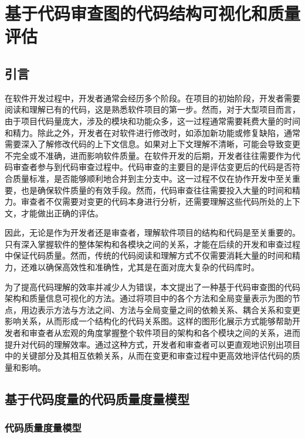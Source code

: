 \chapter{基于代码审查图的代码结构可视化和质量评估}
\section{引言}


在软件开发过程中，开发者通常会经历多个阶段。在项目的初始阶段，开发者需要阅读和理解已有的代码，这是熟悉软件项目的第一步。然而，对于大型项目而言，由于项目代码量庞大，涉及的模块和功能众多，这一过程通常需要耗费大量的时间和精力。除此之外，开发者在对软件进行修改时，如添加新功能或修复缺陷，通常需要深入了解修改代码的上下文信息。如果对上下文理解不清晰，可能会导致变更不完全或不准确，进而影响软件质量。在软件开发的后期，开发者往往需要作为代码审查者参与到代码审查过程中。代码审查的主要目的是评估变更后的代码是否符合质量标准，是否能够顺利地合并到主分支中。这一过程不仅在协作开发中至关重要，也是确保软件质量的有效手段。然而，代码审查往往需要投入大量的时间和精力\cite{花子涵2024代码审查自动化研究综述}。审查者不仅需要对变更的代码本身进行分析，还需要理解这些代码所处的上下文，才能做出正确的评估。

因此，无论是作为开发者还是审查者，理解软件项目的结构和代码是至关重要的。只有深入掌握软件的整体架构和各模块之间的关系，才能在后续的开发和审查过程中保证代码质量。然而，传统的代码阅读和理解方式不仅需要消耗大量的时间和精力，还难以确保高效性和准确性，尤其是在面对庞大复杂的代码库时。

为了提高代码理解的效率并减少人为错误，本文提出了一种基于代码审查图的代码架构和质量信息可视化的方法。通过将项目中的各个方法和全局变量表示为图的节点，用边表示方法与方法之间、方法与全局变量之间的依赖关系、耦合关系和变更影响关系，从而形成一个结构化的代码关系图。这样的图形化展示方式能够帮助开发者和审查者从宏观的角度掌握整个软件项目的架构和各个模块之间的关系，进而提升对代码的理解效率。通过这种方式，开发者和审查者可以更直观地识别出项目中的关键部分及其相互依赖关系，从而在变更和审查过程中更高效地评估代码的质量和影响。

\section{基于代码度量的代码质量度量模型}

\subsection{代码质量度量模型}

